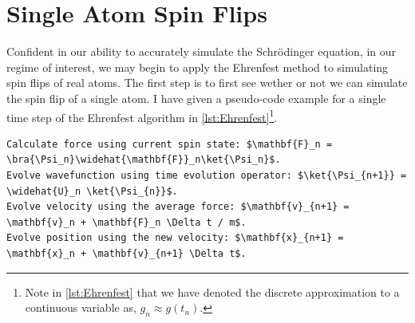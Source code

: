 
\section{Single Atom Spin Flips} \label{sec:EhrenfestSingleAtom}

Confident in our ability to accurately simulate the Schr\"odinger equation, in our regime of interest, we may begin to apply the Ehrenfest method to simulating spin flips of real atoms.
The first step is to first see wether or not we can simulate the spin flip of a single atom.
I have given a pseudo-code example for a single time step of the Ehrenfest algorithm in \autoref{lst:Ehrenfest}\footnote{Note in \autoref{lst:Ehrenfest} that we have denoted the discrete approximation to a continuous variable as, $g_n \approx g(t_n)$.}.
\begin{lstlisting}[float,caption=Psuedo-code algorithm for a single Ehrenfest method time step, mathescape,label= lst:Ehrenfest,stepnumber=1]
Calculate force using current spin state: $\mathbf{F}_n = \bra{\Psi_n}\widehat{\mathbf{F}}_n\ket{\Psi_n}$.
Evolve wavefunction using time evolution operator: $\ket{\Psi_{n+1}} = \widehat{U}_n \ket{\Psi_{n}}$.
Evolve velocity using the average force: $\mathbf{v}_{n+1} = \mathbf{v}_n + \mathbf{F}_n \Delta t / m$.
Evolve position using the new velocity: $\mathbf{x}_{n+1} = \mathbf{x}_n + \mathbf{v}_{n+1} \Delta t$.
\end{lstlisting}

